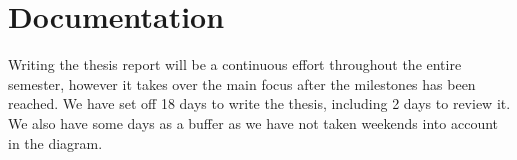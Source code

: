\section*{Documentation}
Writing the thesis report will be a continuous effort throughout the entire semester,
however it takes over the main focus after the milestones has been reached.
We have set off 18 days to write the thesis, including 2 days to review it.
We also have some days as a buffer as we have not taken weekends into account in the diagram.
